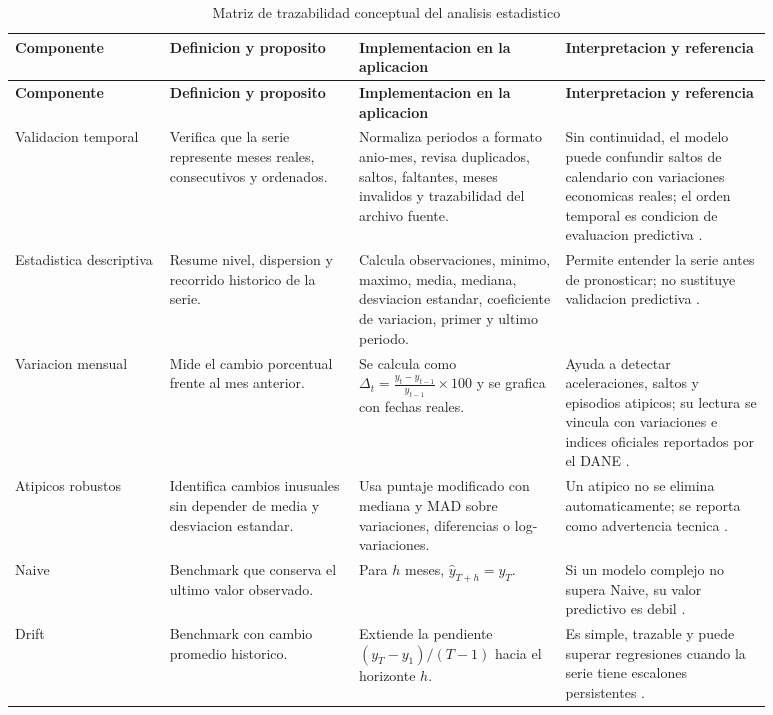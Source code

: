 ﻿\documentclass[12pt,letterpaper]{article}
\newcommand{\yhat}{\hat{y}}
\begin{document}
\begin{longtable}{p{0.18\linewidth}p{0.22\linewidth}p{0.24\linewidth}p{0.24\linewidth}}
\caption{Matriz de trazabilidad conceptual del analisis estadistico}\label{tab:matriz_conceptual}\\
\toprule
\textbf{Componente} & \textbf{Definicion y proposito} & \textbf{Implementacion en la aplicacion} & \textbf{Interpretacion y referencia} \\
\midrule
\endfirsthead
\toprule
\textbf{Componente} & \textbf{Definicion y proposito} & \textbf{Implementacion en la aplicacion} & \textbf{Interpretacion y referencia} \\
\midrule
\endhead
Validacion temporal & Verifica que la serie represente meses reales, consecutivos y ordenados. & Normaliza periodos a formato anio-mes, revisa duplicados, saltos, faltantes, meses invalidos y trazabilidad del archivo fuente. & Sin continuidad, el modelo puede confundir saltos de calendario con variaciones economicas reales; el orden temporal es condicion de evaluacion predictiva \citep{tashman2000,hyndman2021fpp3}. \\
\addlinespace
Estadistica descriptiva & Resume nivel, dispersion y recorrido historico de la serie. & Calcula observaciones, minimo, maximo, media, mediana, desviacion estandar, coeficiente de variacion, primer y ultimo periodo. & Permite entender la serie antes de pronosticar; no sustituye validacion predictiva \citep{nist_eda_summary}. \\
\addlinespace
Variacion mensual & Mide el cambio porcentual frente al mes anterior. & Se calcula como \(\Delta_t = \frac{y_t - y_{t-1}}{y_{t-1}}\times 100\) y se grafica con fechas reales. & Ayuda a detectar aceleraciones, saltos y episodios atipicos; su lectura se vincula con variaciones e indices oficiales reportados por el DANE \citep{dane2021metodologia}. \\
\addlinespace
Atipicos robustos & Identifica cambios inusuales sin depender de media y desviacion estandar. & Usa puntaje modificado con mediana y MAD sobre variaciones, diferencias o log-variaciones. & Un atipico no se elimina automaticamente; se reporta como advertencia tecnica \citep{nist_outliers}. \\
\addlinespace
Naive & Benchmark que conserva el ultimo valor observado. & Para \(h\) meses, \(\yhat_{T+h}=y_T\). & Si un modelo complejo no supera Naive, su valor predictivo es debil \citep{hyndman2021fpp3}. \\
\addlinespace
Drift & Benchmark con cambio promedio historico. & Extiende la pendiente \((y_T-y_1)/(T-1)\) hacia el horizonte \(h\). & Es simple, trazable y puede superar regresiones cuando la serie tiene escalones persistentes \citep{hyndman2021fpp3}. \\

\end{longtable}
\end{document}
